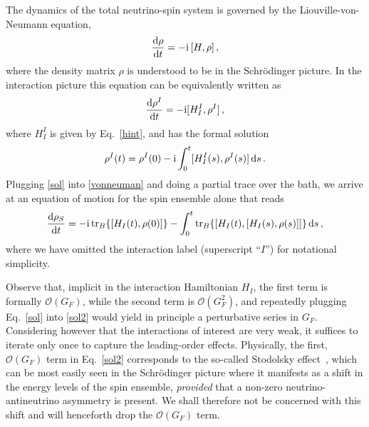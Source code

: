 \documentclass[aps,prd,10pt,twocolumn,superscriptaddress,floatfix,nofootinbib,amsmath,amssymb,altaffilletter,preprintnumbers]{revtex4-1}
\begin{document}
The dynamics of the total neutrino-spin system is governed by the Liouville-von-Neumann equation,
\begin{equation}
    \frac{\mathrm{d} \rho}{\mathrm{d}t}=-{\rm i}\, [H,\rho]\, ,
\end{equation}
where the density matrix $\rho$ is understood to be in the Schr\"{o}dinger picture.
In the interaction picture this equation can be equivalently written as
\begin{equation}
    \frac{\mathrm{d} \rho^I}{\mathrm{d}t}=-{\rm i}[H^I_I,\rho^I]\, ,
    \label{vonneuman}
\end{equation}
where $H^I_I$ is given by Eq.~\eqref{hint}, and has the formal solution 
\begin{equation}
    \rho^I(t)=\rho^I(0)-{\rm i}\int_0^t[H^I_I(s),\rho^I(s)]\, {\rm d}s\, .
    \label{sol}
\end{equation}
Plugging \eqref{sol} into \eqref{vonneuman} and doing a partial trace over the bath, we arrive at an equation of motion for the spin ensemble alone that reads
\begin{equation}
     \frac{\mathrm{d} \rho_S}{\mathrm{d}t}=-{\rm i} \, \text{tr}_B\{[H_I(t),\rho(0)]\}-\int_0^t\text{tr}_B\{[H_I(t),[H_I(s),\rho(s)]]\}\, {\rm d}s\, ,
     \label{sol2}
\end{equation}
where we have omitted the interaction label (superscript ``$I$'') for notational simplicity. 

Observe that,  implicit in the interaction Hamiltonian $H_{I}$, the first term is formally $\mathcal{O} (G_{F})$, while the second term is $\mathcal{O} (G_{F}^{2})$, and  repeatedly plugging Eq.~\eqref{sol} into \eqref{sol2} would yield in principle a perturbative series in $G_F$. Considering however that the interactions of interest are very weak, it suffices to iterate only once to capture the leading-order effects. Physically, the first, $\mathcal{O}(G_F)$ term in Eq.~\eqref{sol2} corresponds to the so-called  Stodolsky effect~\cite{Stodolsky:1974aq}, which can be most easily seen in the Schr\"{o}dinger picture where it manifests as a shift in the energy levels of the spin ensemble, {\it provided} that a non-zero neutrino-antineutrino asymmetry is present.  We shall therefore not be concerned with this shift and will henceforth drop the $\mathcal{O}(G_F)$ term.
\end{document}
